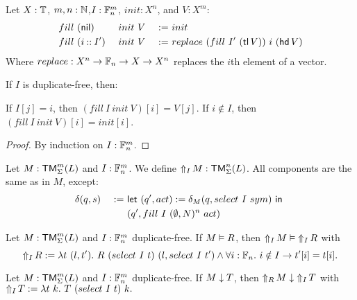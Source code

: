 \begin{definition}
  Let $X:\Type$, $m,n:\Nat$,$I:\Fin_n^m$, $init:X^n$, and $V:X^m$:
  \begin{alignat*}{3}
    & fill~(\nil      )&& ~init~V &~:=~& init \\
    & fill~(i \cons I')&& ~init~V &~:=~& replace~(fill~I'~(\tl V))~i~(\hd V)
  \end{alignat*}
  Where $replace : X^n \to \Fin_n \to X \to X^n$ replaces the $i$th element of a vector.
\end{definition}
\begin{lemma}
  If $I$ is duplicate-free, then:
  \begin{enumerate}
   \label{lem:fill_correct_nth}
    If $I[j]=i$, then $(fill~I~init~V)[i] = V[j]$.
   \label{lem:fill_not_index}
    If $i \notin I$, then $(fill~I~init~V)[i] = init[i]$.
  \end{enumerate}
\end{lemma}
\begin{proof}
  By induction on $I : \Fin_n^m$.
\end{proof}

\begin{definition}[$\LiftTapes{M}{I}$][LiftTapes]
  \label{def:LiftTapes}
  Let $M:\TM_\Sigma^m(L)$ and $I : \Fin_n^m$.  We define $\LiftTapes{M}{I} : \TM_\Sigma^n(L)$.  All components are the same as in $M$, except:
  \begin{alignat*}{2}
    &\delta(q,s) &~:=~& \Let{(q', act) := \delta_M(q, select~I~sym)}{\\%
    &            &~  ~& (q', fill~I~(\None,N)^n~act)}
  \end{alignat*}
\end{definition}

\begin{lemma}
  \label{lem:LiftTapes_Realise}
  Let $M : \TM_\Sigma^m(L)$ and $I : \Fin_n^m$ duplicate-free.  If $M \Realise R$, then $\LiftTapes{M}{I} \Realise \LiftTapes{R}{I}$ with
  \[
    \LiftTapes{R}{I} := \lambda t~(l,t').~ R~(select~I~t)~(l, select~I~t') \land \forall i:\Fin_n.~i \notin I \rightarrow t'[i]=t[i].
  \]
\end{lemma}

\begin{lemma}
  \label{lem:LiftTapes_TerminatesIn}
  Let $M : \TM_\Sigma^m(L)$ and $I : \Fin_n^m$ duplicate-free. If $M \TerminatesIn T$, then $\LiftTapes{M}{R} \TerminatesIn \LiftTapes{T}{I}$ with
  $ \LiftTapes{T}{I} := \lambda t~k.~ T~(select~I~t)~k.  $
\end{lemma}

